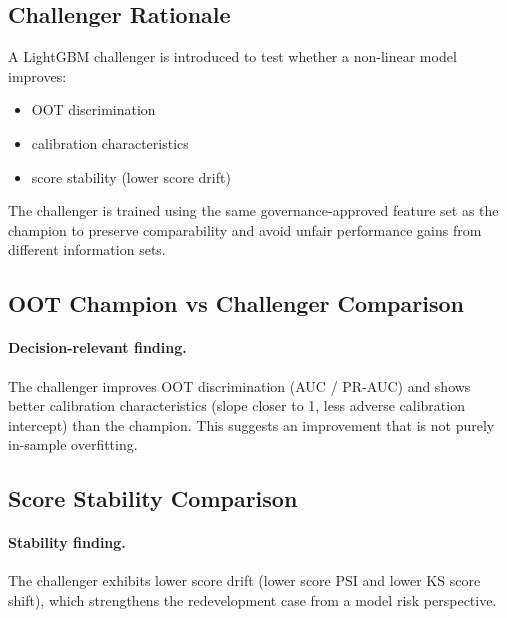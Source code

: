 \documentclass[11pt,a4paper]{article}
\begin{document}
\subsection{Challenger Rationale}
A LightGBM challenger is introduced to test whether a non-linear model improves:
\begin{itemize}[leftmargin=*, itemsep=0.25em]
\item OOT discrimination
\item calibration characteristics
\item score stability (lower score drift)
\end{itemize}
The challenger is trained using the same governance-approved feature set as the champion to preserve comparability and avoid unfair performance gains from different information sets.

\subsection{OOT Champion vs Challenger Comparison}
\begin{table}[H]
\centering
\caption{Out-of-time comparison: Champion vs Challenger.}
\label{tab:oot_compare}

\end{table}

\paragraph{Decision-relevant finding.}
The challenger improves OOT discrimination (AUC / PR-AUC) and shows better calibration characteristics (slope closer to 1, less adverse calibration intercept) than the champion. This suggests an improvement that is not purely in-sample overfitting.

\subsection{Score Stability Comparison}
\begin{table}[H]
\centering
\caption{Score stability summary (Train to OOT).}
\label{tab:score_stability_compare}
{\setlength{\tabcolsep}{4pt}\renewcommand{\arraystretch}{1.08}}
\end{table}

\paragraph{Stability finding.}
The challenger exhibits lower score drift (lower score PSI and lower KS score shift), which strengthens the redevelopment case from a model risk perspective.
\end{document}
